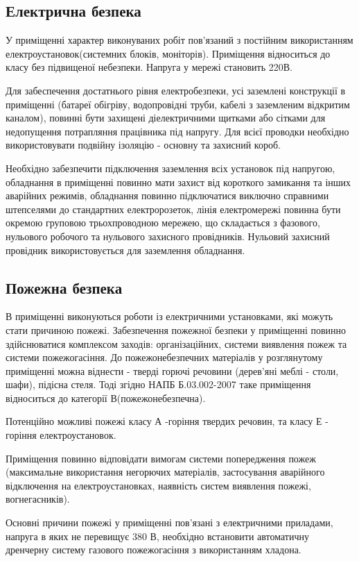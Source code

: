 \subsection{Електрична безпека}
    У приміщенні характер виконуваних робіт пов'язаний з постійним використанням електроустановок(системних блоків, моніторів). Приміщення відноситься до класу без підвищеної небезпеки. Напруга у мережі становить 220В.

    Для забеспечення достатнього рівня електробезпеки, усі заземлені конструкції в приміщенні (батареї обігріву, водопровідні труби, кабелі з заземленим відкритим каналом), повинні бути захищені діелектричними щитками або сітками для недопущення потрапляння працівника під напругу. Для всієї проводки необхідно використовувати подвійну ізоляцію - основну та захисний короб.

    Необхідно забезпечити підключення заземлення всіх установок під напругою, обладнання в приміщенні повинно мати захист від короткого замикання та інших аварійних режимів, обладнання повинно підключатися виключно справними штепселями до стандартних електророзеток, лінія електромережі повинна бути окремою груповою трьохпроводною мережею, що складається з фазового, нульового робочого та нульового захисного провідників. Нульовий захисний провідник використовується для заземлення обладнання.

\subsection{Пожежна безпека}
    В приміщенні виконуються роботи із електричними установками, які можуть стати причиною пожежі. Забезпечення пожежної безпеки у приміщенні повинно здійснюватися комплексом заходів: організаційних, системи виявлення пожеж та системи пожежогасіння.
    До пожежонебезпечних матеріалів у розглянутому приміщенні можна віднести - тверді горючі речовини (дерев'яні меблі - столи, шафи), підісна стеля. Тоді згідно НАПБ Б.03.002-2007\cite{lab-napb} таке приміщення відноситься до категорії В(пожежонебезпечна).

    Потенційно можливі пожежі класу А -горіння твердих речовин, та класу Е - горіння електроустановок.

    Приміщення повинно відповідати вимогам системи попередження пожеж (максимальне використання негорючих матеріалів, застосування аварійного відключення на електроустановках, наявність систем виявлення пожежі, вогнегасників).

    Основні причини пожежі у приміщенні пов'язані з електричними приладами, напруга в яких не перевищує 380 В, необхідно встановити автоматичну дренчерну систему газового пожежогасіння з використанням хладона.

